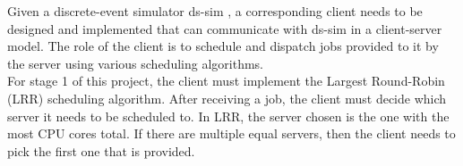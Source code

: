 Given a discrete-event simulator ds-sim \cite{ds-sim}, a corresponding client needs to be designed and implemented that can communicate with ds-sim in a client-server model. The role of the client is to schedule and dispatch jobs provided to it by the server using various scheduling algorithms. \\
\vspace{.2cm}
For stage 1 of this project, the client must implement the Largest Round-Robin (LRR) scheduling algorithm. After receiving a job, the client must decide which server it needs to be scheduled to. In LRR, the server chosen is the one with the most CPU cores total. If there are multiple equal servers, then the client needs to pick the first one that is provided.